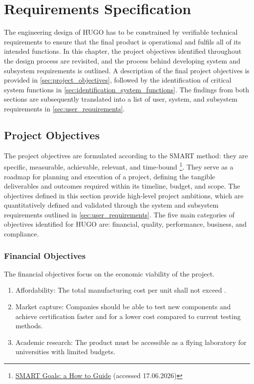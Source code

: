 \chapter{Requirements Specification}
\label{ch:requirements}

The engineering design of HUGO has to be constrained by verifiable technical requirements to ensure that the final product is operational and fulfils all of its intended functions. In this chapter, the project objectives identified throughout the design process are revisited, and the process behind developing system and subsystem requirements is outlined. A description of the final project objectives is provided in \autoref{sec:project_objectives}, followed by the identification of critical system functions in \autoref{sec:identification_system_functions}. The findings from both sections are subsequently translated into a list of user, system, and subsystem requirements in \autoref{sec:user_requirements}.



\section{Project Objectives}
\label{sec:project_objectives}

The project objectives are formulated according to the SMART method: they are specific, measurable, achievable, relevant, and time-bound \footnote{\href{https://www.ucop.edu/local-human-resources/_files/performance-appraisal/How+to+write+SMART+Goals+v2.pdf}{SMART Goals: a How to Guide} (accessed 17.06.2026)}. They serve as a roadmap for planning and execution of a project, defining the tangible deliverables and outcomes required within its timeline, budget, and scope. The objectives defined in this section provide high-level project ambitions, which are quantitatively defined and validated through the system and subsystem requirements outlined in \autoref{sec:user_requirements}. The five main categories of objectives identified for HUGO are: financial, quality, performance, business, and compliance.

\subsection{Financial Objectives}
The financial objectives focus on the economic viability of the project.

\begin{enumerate}

    \item Affordability: The total manufacturing cost per unit shall not exceed  .
    
    \item Market capture: Companies should be able to test new components and achieve certification faster and for a lower cost compared to current testing methods.
    
    \item Academic research: The product must be accessible as a flying laboratory for universities with limited budgets.
\end{enumerate}

